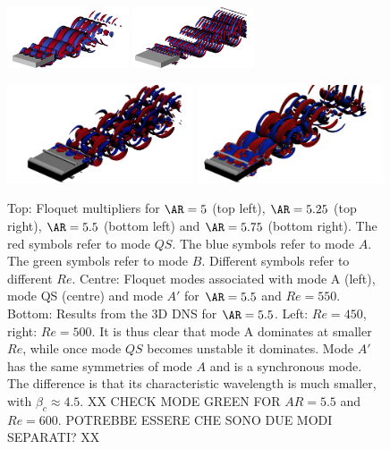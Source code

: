 \begin{figure}
  \includegraphics[width=0.32\textwidth]{./fig/AR5s/Floqetmode_beta_2_Re550_AR5p5_QS.png} 
  \includegraphics[width=0.32\textwidth]{./fig/AR5s/Floqetmode_beta_4p75_Re550_AR5p5_Ap.png}
  \vspace{0.1cm}
  \vspace{0.1cm}
  \includegraphics[width=0.49\textwidth]{./fig/AR5s/lambda2-AR55-Re450-3D.png}   
  \includegraphics[width=0.49\textwidth]{./fig/AR5s/lambda2-AR55-Re500-3D.png}     
  \caption{Top: Floquet multipliers for $\AR=5$ (top left), $\AR=5.25$ (top right), $\AR=5.5$ (bottom left) and $\AR=5.75$ (bottom right). The red symbols refer to mode $QS$. The blue symbols refer to mode $A$. The green symbols refer to mode $B$. Different symbols refer to different $Re$. Centre: Floquet modes associated with mode A (left), mode QS (centre) and mode $A'$ for $\AR=5.5$ and $Re=550$. Bottom: Results from the 3D DNS for $\AR=5.5$. Left: $Re=450$, right: $Re=500$. It is thus clear that mode A dominates at smaller $Re$, while once mode $QS$ becomes unstable it dominates. Mode $A'$ has the same symmetries of mode $A$ and is a synchronous mode. The difference is that its characteristic wavelength is much smaller, with $\beta_c \approx 4.5$. XX CHECK MODE GREEN FOR $AR=5.5$ and $Re=600$. POTREBBE ESSERE CHE SONO DUE MODI SEPARATI? XX}
  \label{fig:mult_AR5s}
\end{figure} 


